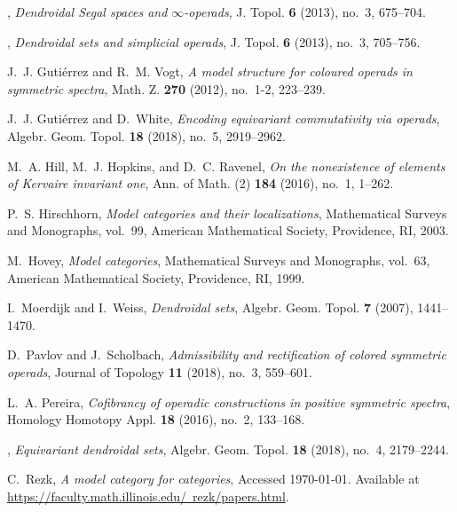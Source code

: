 \documentclass[a4paper,10pt
]{article}%
\numberwithin{equation}{section}
\numberwithin{figure}{section}
\theoremstyle{definition} %
\newcommand{\1}{\ensuremath{\mathbbm 1}}%
\begin{document}
\begin{thebibliography}{HHR16}
\bysame, \emph{Dendroidal {S}egal spaces and {$\infty$}-operads}, J. Topol.
  \textbf{6} (2013), no.~3, 675--704. 

\bysame, \emph{Dendroidal sets and simplicial operads}, J. Topol. \textbf{6}
  (2013), no.~3, 705--756. 

J.~J. Guti\'{e}rrez and R.~M. Vogt, \emph{A model structure for coloured
  operads in symmetric spectra}, Math. Z. \textbf{270} (2012), no.~1-2,
  223--239. 

J.~J. Guti\'{e}rrez and D.~White, \emph{Encoding equivariant commutativity via
  operads}, Algebr. Geom. Topol. \textbf{18} (2018), no.~5, 2919--2962.

M.~A. Hill, M.~J. Hopkins, and D.~C. Ravenel, \emph{On the nonexistence of
  elements of {K}ervaire invariant one}, Ann. of Math. (2) \textbf{184} (2016),
  no.~1, 1--262. 

P.~S. Hirschhorn, \emph{Model categories and their localizations}, Mathematical
  Surveys and Monographs, vol.~99, American Mathematical Society, Providence,
  RI, 2003.

M.~Hovey, \emph{Model categories}, Mathematical Surveys and Monographs,
  vol.~63, American Mathematical Society, Providence, RI, 1999.

I.~Moerdijk and I.~Weiss, \emph{Dendroidal sets}, Algebr. Geom. Topol.
  \textbf{7} (2007), 1441--1470. 

D.~Pavlov and J.~Scholbach, \emph{Admissibility and rectification of colored
  symmetric operads}, Journal of Topology \textbf{11} (2018), no.~3, 559--601.

L.~A. Pereira, \emph{Cofibrancy of operadic constructions in positive symmetric
  spectra}, Homology Homotopy Appl. \textbf{18} (2016), no.~2, 133--168.

\bysame, \emph{Equivariant dendroidal sets}, Algebr. Geom. Topol. \textbf{18}
  (2018), no.~4, 2179--2244. 

C.~Rezk, \emph{A model category for categories}, Accessed \today. Available at
  \href{https://faculty.math.illinois.edu/~rezk/papers.html}{https://faculty.math.illinois.edu/~rezk/papers.html}.


\end{thebibliography}
\end{document}
